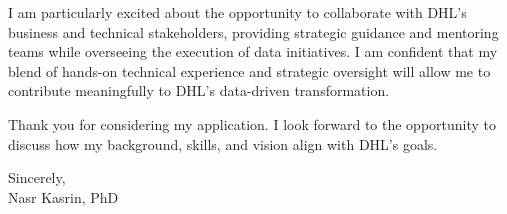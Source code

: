 {I am particularly excited about the opportunity to collaborate with DHL's business and technical stakeholders, providing strategic guidance and mentoring teams while overseeing the execution of data initiatives. I am confident that my blend of hands-on technical experience and strategic oversight will allow me to contribute meaningfully to DHL's data-driven transformation.

Thank you for considering my application. I look forward to the opportunity to discuss how my background, skills, and vision align with DHL’s goals.

\vspace{5ex}

Sincerely,\\
	
Nasr Kasrin, PhD}

